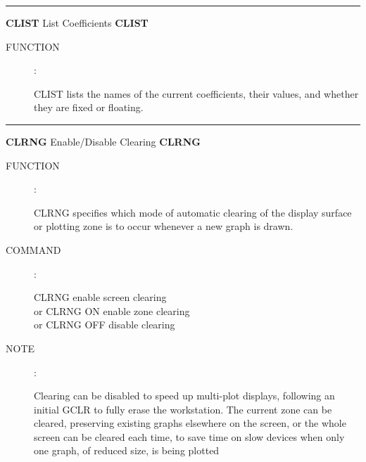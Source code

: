 
\goodbreak
\rule{\textwidth}{0.3mm}
{\Large {\bf CLIST} \hfill List Coefficients \hfill {\bf CLIST}}
\begin{description}
\item [FUNCTION]:

CLIST lists the names of the current coefficients,
their values, and whether they are fixed or floating.

\end{description}


\goodbreak
\rule{\textwidth}{0.3mm}
{\Large {\bf CLRNG} \hfill Enable/Disable Clearing \hfill {\bf CLRNG}}
\begin{description}
\item [FUNCTION]:

CLRNG specifies which mode of
automatic clearing of the display surface or plotting
zone is to occur whenever a new graph is drawn.

\item [COMMAND]:

\begin{cmd}
\> \> CLRNG \> enable screen clearing \\
\> or \> CLRNG ON \> enable zone clearing \\
\> or \> CLRNG OFF \> disable clearing
\end{cmd}

\item [NOTE]:

Clearing can be disabled to speed up multi-plot displays,
following an initial GCLR to fully erase the workstation.
The current zone can be cleared, preserving existing graphs
elsewhere on the screen, or the whole screen can be cleared
each time, to save time on slow devices when only one graph,
of reduced size, is being plotted

\end{description}



